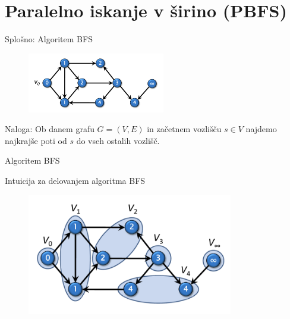 \documentclass{beamer}
\begin{document}
\section{Paralelno iskanje v širino (PBFS)}

\begin{frame}{Splošno: Algoritem BFS}
    \begin{figure}
        \centering
        \includegraphics[width=6cm]{slike/parallel_bfs/pbfs_graph_example.png}
        \label{fig:pbfs_graph_example}
    \end{figure}
    Naloga: Ob danem grafu $G=(V, E)$ in začetnem vozlišču $s \in V$ najdemo najkrajše poti od $s$ do vseh ostalih vozlišč.
\end{frame}

\begin{frame}{Algoritem BFS}
    \begin{algorithm}[H]
      \SetAlgoLined
      \DontPrintSemicolon
      \label{alg:non_parallel_bfs}
    \end{algorithm}
  \end{frame}
  
\begin{frame}{Intuicija za delovanjem algoritma BFS}
    \begin{figure}
        \centering
        \includegraphics[width=9cm]{slike/parallel_bfs/pbfs_graph_by_levels.png}
        \label{fig:pbfs_graph_example}
    \end{figure}
\end{frame}
\end{document}
